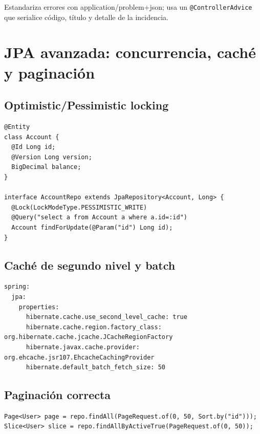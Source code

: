 \documentclass[11pt,a4paper]{article}
\begin{document}
\begin{tipbox}
Estandariza errores con application/problem+json; usa un \texttt{@ControllerAdvice} que serialice código, título y detalle de la incidencia.
\end{tipbox}

\section{JPA avanzada: concurrencia, caché y paginación}
\subsection{Optimistic/Pessimistic locking}
\begin{lstlisting}[style=javastyle, caption={@Version y bloqueo pesimista}] 
@Entity
class Account {
  @Id Long id;
  @Version Long version;
  BigDecimal balance;
}

interface AccountRepo extends JpaRepository<Account, Long> {
  @Lock(LockModeType.PESSIMISTIC_WRITE)
  @Query("select a from Account a where a.id=:id")
  Account findForUpdate(@Param("id") Long id);
}
\end{lstlisting}

\subsection{Caché de segundo nivel y batch}
\begin{lstlisting}[style=yamlstyle, caption={Ehcache/Hibernate y batch}] 
spring:
  jpa:
    properties:
      hibernate.cache.use_second_level_cache: true
      hibernate.cache.region.factory_class: org.hibernate.cache.jcache.JCacheRegionFactory
      hibernate.javax.cache.provider: org.ehcache.jsr107.EhcacheCachingProvider
      hibernate.default_batch_fetch_size: 50
\end{lstlisting}

\subsection{Paginación correcta}
\begin{lstlisting}[style=javastyle, caption={Page vs Slice y orden estable}] 
Page<User> page = repo.findAll(PageRequest.of(0, 50, Sort.by("id")));
Slice<User> slice = repo.findAllByActiveTrue(PageRequest.of(0, 50));
\end{lstlisting}
\end{document}
